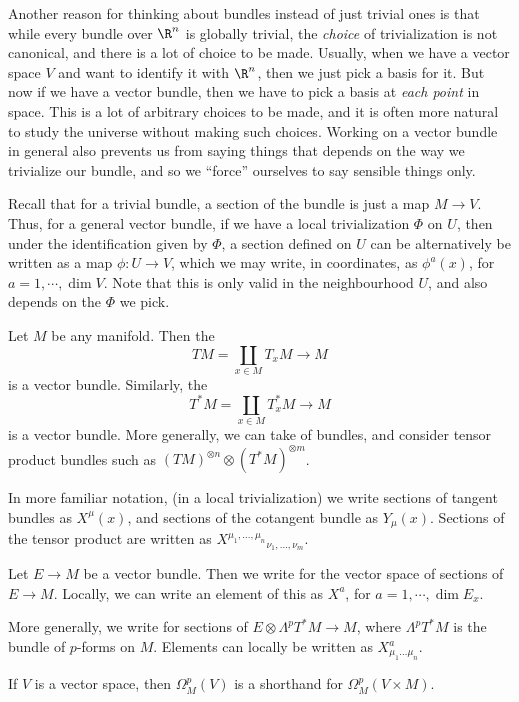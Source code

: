 \documentclass[a4paper]{article}
\begin{document}
Another reason for thinking about bundles instead of just trivial ones is that while every bundle over $\R^n$ is globally trivial, the \emph{choice} of trivialization is not canonical, and there is a lot of choice to be made. Usually, when we have a vector space $V$ and want to identify it with $\R^n$, then we just pick a basis for it. But now if we have a vector bundle, then we have to pick a basis at \emph{each point} in space. This is a lot of arbitrary choices to be made, and it is often more natural to study the universe without making such choices. Working on a vector bundle in general also prevents us from saying things that depends on the way we trivialize our bundle, and so we ``force'' ourselves to say sensible things only.

Recall that for a trivial bundle, a section of the bundle is just a map $M \to V$. Thus, for a general vector bundle, if we have a local trivialization $\Phi$ on $U$, then under the identification given by $\Phi$, a section defined on $U$ can be alternatively be written as a map $\phi: U \to V$, which we may write, in coordinates, as $\phi^a(x)$, for $a = 1, \cdots, \dim V$. Note that this is only valid in the neighbourhood $U$, and also depends on the $\Phi$ we pick.

\begin{eg}
  Let $M$ be any manifold. Then the 
  \[
    TM = \coprod_{x \in M} T_x M \to M
  \]
  is a vector bundle. Similarly, the 
  \[
    T^*M = \coprod_{x \in M} T_x^* M \to M
  \]
  is a vector bundle. More generally, we can take  of bundles, and consider tensor product bundles such as $(TM)^{\otimes n} \otimes (T^*M)^{\otimes m}$. %

  In more familiar notation, (in a local trivialization) we write sections of tangent bundles as $X^\mu(x)$, and sections of the cotangent bundle as $Y_\mu(x)$. Sections of the tensor product are written as $X^{\mu_1, \ldots, \mu_n}\!_{\nu_1, \ldots, \nu_m}$.
\end{eg}


\begin{notation}
  Let $E \to M$ be a vector bundle. Then we write  for the vector space of sections of $E \to M$. Locally, we can write an element of this as $X^a$, for $a = 1, \cdots, \dim E_x$.

  More generally, we write  for sections of $E \otimes \Lambda^pT^*M \to M$, where $\Lambda^p T^*M$ is the bundle of $p$-forms on $M$. Elements can locally be written as $X^a_{\mu_1 \ldots \mu_n}$.

  If $V$ is a vector space, then $\Omega^p_M(V)$ is a shorthand for $\Omega^p_M(V \times M)$. %
\end{notation}
\end{document}
